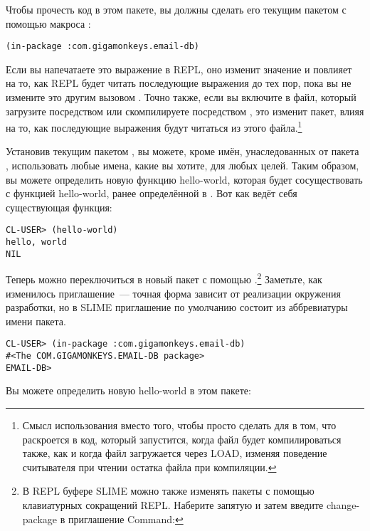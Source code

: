 Чтобы прочесть код в этом пакете, вы должны сделать его текущим пакетом с помощью макроса
:

\begin{lstlisting}
(in-package :com.gigamonkeys.email-db)
\end{lstlisting}

Если вы напечатаете это выражение в REPL, оно изменит значение  и повлияет
на то, как REPL будет читать последующие выражения до тех пор, пока вы не измените это
другим вызовом . Точно также, если вы включите  в файл,
который загрузите посредством  или скомпилируете посредством
, это изменит пакет, влияя на то, как последующие выражения будут
читаться из этого файла.\footnote{Смысл использования  вместо того,
  чтобы просто сделать  для  в том, что 
  раскроется в код, который запустится, когда файл будет компилироваться
   также, как и когда файл загружается через LOAD, изменяя поведение
  считывателя при чтении остатка файла при компиляции.}

Установив текущим пакетом , вы можете, кроме имён,
унаследованных от пакета , использовать любые имена, какие вы хотите,
для любых целей. Таким образом, вы можете определить новую функцию hello-world, которая
будет сосуществовать с функцией hello-world, ранее определённой в
. Вот как ведёт себя существующая функция:

\begin{lstlisting}
CL-USER> (hello-world)
hello, world
NIL
\end{lstlisting}

Теперь можно переключиться в новый пакет с помощью .\footnote{В REPL
буфере SLIME можно также изменять пакеты с помощью клавиатурных сокращений REPL. Наберите
запятую и затем введите change-package в приглашение Command:} Заметьте, как изменилось
приглашение~--- точная форма зависит от реализации окружения разработки, но в SLIME
приглашение по умолчанию состоит из аббревиатуры имени пакета.

\begin{lstlisting}
CL-USER> (in-package :com.gigamonkeys.email-db)
#<The COM.GIGAMONKEYS.EMAIL-DB package>
EMAIL-DB> 
\end{lstlisting}

Вы можете определить новую hello-world в этом пакете:

